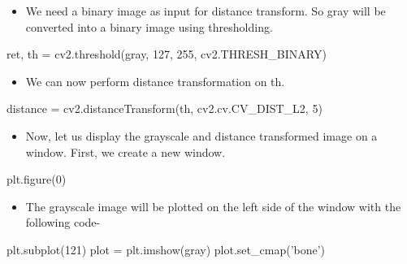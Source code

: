 \documentclass[]{article}
\newenvironment{Shaded}{}{}
\newcommand{\DecValTok}[1]{\textcolor[rgb]{0.25,0.63,0.44}{{#1}}}
\newcommand{\StringTok}[1]{\textcolor[rgb]{0.25,0.44,0.63}{{#1}}}
\newcommand{\OperatorTok}[1]{\textcolor[rgb]{0.40,0.40,0.40}{{#1}}}
\newcommand{\NormalTok}[1]{{#1}}
\providecommand{\tightlist}{%
  \setlength{\itemsep}{0pt}\setlength{\parskip}{0pt}}
\begin{document}
\begin{itemize}
\tightlist
\item
  We need a binary image as input for distance transform. So gray will
  be converted into a binary image using thresholding.
\end{itemize}

\begin{Shaded}
\begin{Highlighting}[]
    \NormalTok{ret, th }\OperatorTok{=} \NormalTok{cv2.threshold(gray, }\DecValTok{127}\NormalTok{, }\DecValTok{255}\NormalTok{, cv2.THRESH_BINARY)}
\end{Highlighting}
\end{Shaded}

\begin{itemize}
\tightlist
\item
  We can now perform distance transformation on th.
\end{itemize}

\begin{Shaded}
\begin{Highlighting}[]
    \NormalTok{distance }\OperatorTok{=} \NormalTok{cv2.distanceTransform(th, cv2.cv.CV_DIST_L2, }\DecValTok{5}\NormalTok{)}
\end{Highlighting}
\end{Shaded}

\begin{itemize}
\tightlist
\item
  Now, let us display the grayscale and distance transformed image on a
  window. First, we create a new window.
\end{itemize}

\begin{Shaded}
\begin{Highlighting}[]
    \NormalTok{plt.figure(}\DecValTok{0}\NormalTok{)}
\end{Highlighting}
\end{Shaded}

\begin{itemize}
\tightlist
\item
  The grayscale image will be plotted on the left side of the window
  with the following code-
\end{itemize}

\begin{Shaded}
\begin{Highlighting}[]
    \NormalTok{plt.subplot(}\DecValTok{121}\NormalTok{)}
    \NormalTok{plot }\OperatorTok{=} \NormalTok{plt.imshow(gray)}
    \NormalTok{plot.set_cmap(}\StringTok{'bone'}\NormalTok{)}
\end{Highlighting}
\end{Shaded}
\end{document}
